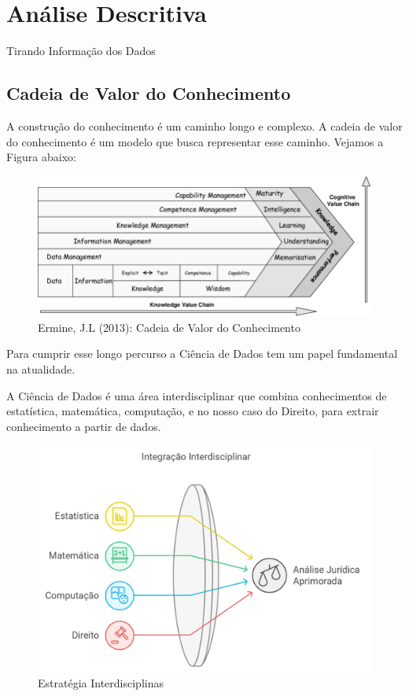 \documentclass[
  letterpaper,
  DIV=11,
  numbers=noendperiod]{scrreprt}
\begin{document}
\chapter{Análise Descritiva}\label{anuxe1lise-descritiva}

Tirando Informação dos Dados

\hfill\break

\section{Cadeia de Valor do
Conhecimento}\label{cadeia-de-valor-do-conhecimento}

A construção do conhecimento é um caminho longo e complexo. A cadeia de
valor do conhecimento é um modelo que busca representar esse caminho.
Vejamos a Figura abaixo:

\begin{figure}[H]

{\centering \includegraphics[width=0.8\linewidth,height=\textheight,keepaspectratio]{figuras/knowledgeVC.png}

}

\caption{Ermine, J.L (2013): Cadeia de Valor do Conhecimento}

\end{figure}%

Para cumprir esse longo percurso a Ciência de Dados tem um papel
fundamental na atualidade.

A Ciência de Dados é uma área interdisciplinar que combina conhecimentos
de estatística, matemática, computação, e no nosso caso do Direito, para
extrair conhecimento a partir de dados.

\begin{figure}[H]

{\centering \includegraphics[width=0.7\linewidth,height=\textheight,keepaspectratio]{figuras/combina.png}

}

\caption{Estratégia Interdisciplinas}

\end{figure}%
\end{document}

